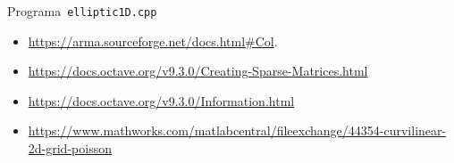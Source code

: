 \begin{problem}
\begin{listing}[ht!]
    \tiny
    \centering
    \inputminted[frame=single,framesep=10pt,linenos,firstline=1,lastline=52,highlightlines={18}]{cpp}{../examples/cpp/elliptic1D.cpp}
    \caption{Programa~\texttt{elliptic1D.cpp}}
\end{listing}

\begin{itemize}
    \item

          \url{https://arma.sourceforge.net/docs.html#Col}.

    \item

          \url{https://docs.octave.org/v9.3.0/Creating-Sparse-Matrices.html}

    \item

          \url{https://docs.octave.org/v9.3.0/Information.html}

    \item

          \url{https://www.mathworks.com/matlabcentral/fileexchange/44354-curvilinear-2d-grid-poisson}
\end{itemize}


\end{problem}
